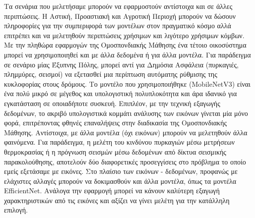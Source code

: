 Τα σενάρια που μελετήσαμε μπορούν να εφαρμοστούν αντίστοιχα και σε άλλες περιπτώσεις. Η Αστική, Προαστιακή και Αγροτική Περιοχή μπορούν να δώσουν πληροφορίες για την συμπεριφορά των μοντέλων στον πραγματικό κόσμο αλλά επιτρέπει και να μελετηθούν περιπτώσεις χρήσιμων και λιγότερο χρήσιμων κόμβων. Με την πληθώρα εφαρμογών της Ομοσπονδιακής Μάθησης ένα τέτοιο οικοσύστημα μπορεί να χρησιμοποιηθεί και με άλλα δεδομένα ή για άλλα μοντέλα. Για παράδειγμα σε σενάριο μίας Έξυπνης Πόλης, μπορεί αντί για Δημόσια Ασφάλεια (πυρκαγιές, πλημμύρες, σεισμοί) να εξετασθεί μια περίπτωση αυτόματης ρύθμισης της κυκλοφορίας στους δρόμους. Το μοντέλο που χρησιμοποιήθηκε (MobileNetV3) είναι ένα πολύ μικρό σε μέγεθος και υπολογιστική πολυπλοκότητα και άρα ιδανικό για εγκατάσταση σε οποιαδήποτε συσκευή. Επιπλέον, με την τεχνική εξαγωγής δεδομένων, το ακριβό υπολογιστικά κομμάτι ανάλυσης των εικόνων γίνεται μία μόνο φορά, επιτρέποντας φθηνές επαναλήψεις στην διαδικασία της Ομοσπονδιακής Μάθησης. Αντίστοιχα, με άλλα μοντέλα (όχι εικόνων) μπορούν να μελετηθούν άλλα φαινόμενα. Για παράδειγμα, η μελέτη του κινδύνου πυρκαγιών μέσω μετρήσεων θερμοκρασίας ή η πρόγνωση σεισμών μέσω δεδομένων από δίκτυα σεισμικής παρακολούθησης, αποτελούν δύο διαφορετικές προσεγγίσεις στο πρόβλημα το οποίο εμείς εξετάσαμε με εικόνες. Στο πλαίσιο των εικόνων - δεδομένων, προφανώς με ελάχιστες αλλαγές μπορούν να δοκιμασθούν και άλλα μοντέλα, όπως τα μοντέλα EfficientNet. Ανάλογα την εφαρμογή μπορεί να κάνουν καλύτερη εξαγωγή χαρακτηριστικών από τις εικόνες και αξίζει να γίνει μελέτη για την κατάλληλη επιλογή.